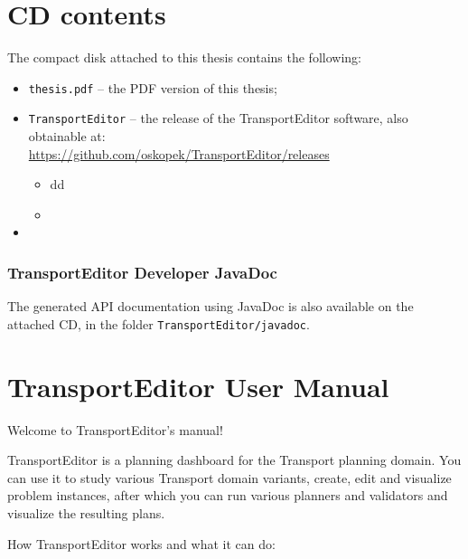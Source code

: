 
\section*{CD contents}\label{cd-contents}

The compact disk attached to this thesis contains the following:

\begin{itemize}
\item \verb+thesis.pdf+ -- the PDF version of this thesis;
\item \verb+TransportEditor+ -- the  release of the TransportEditor software, also obtainable at:\\
\url{https://github.com/oskopek/TransportEditor/releases}
\begin{itemize}
\item  dd
\item {}
\end{itemize}
\item {}
\end{itemize}

\subsubsection*{TransportEditor Developer JavaDoc}\label{transporteditor-developer-javadoc}

The generated API documentation using JavaDoc is also available on the attached CD, in the folder
\verb+TransportEditor/javadoc+.

\newpage

\section*{TransportEditor User Manual}\label{transporteditor-user-manual}

Welcome to TransportEditor's manual!

TransportEditor is a planning dashboard for the Transport planning domain.
You can use it to study various Transport domain variants,
create, edit and visualize problem instances, after which you can
run various planners and validators and visualize the resulting plans.

How TransportEditor works and what it can do:

